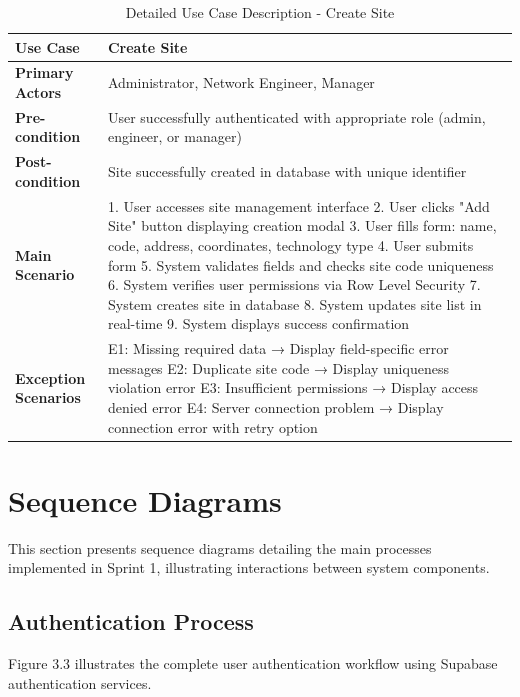 \begin{table}[H]
\centering
\begin{tabular}{|p{3.5cm}|p{8cm}|}
\hline
\textbf{Use Case} & Create Site \\
\hline
\textbf{Primary Actors} & Administrator, Network Engineer, Manager \\
\hline
\textbf{Pre-condition} & User successfully authenticated with appropriate role (admin, engineer, or manager) \\
\hline
\textbf{Post-condition} & Site successfully created in database with unique identifier \\
\hline
\textbf{Main Scenario} & 
1. User accesses site management interface
2. User clicks "Add Site" button displaying creation modal
3. User fills form: name, code, address, coordinates, technology type
4. User submits form
5. System validates fields and checks site code uniqueness
6. System verifies user permissions via Row Level Security
7. System creates site in database
8. System updates site list in real-time
9. System displays success confirmation
\\
\hline
\textbf{Exception Scenarios} & 
E1: Missing required data → Display field-specific error messages
E2: Duplicate site code → Display uniqueness violation error
E3: Insufficient permissions → Display access denied error
E4: Server connection problem → Display connection error with retry option
\\
\hline
\end{tabular}
\caption{Detailed Use Case Description - Create Site}
\label{tab:create_site_usecase}
\end{table}

\section{Sequence Diagrams}

This section presents sequence diagrams detailing the main processes implemented in Sprint 1, illustrating interactions between system components.

\subsection{Authentication Process}

Figure 3.3 illustrates the complete user authentication workflow using Supabase authentication services.


